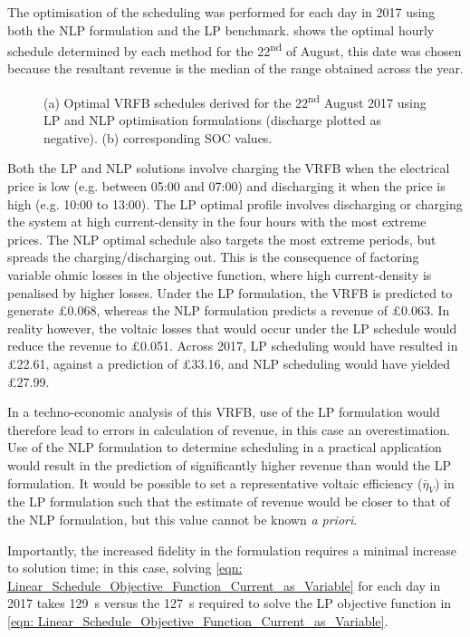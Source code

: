 \documentclass[preprint,3p,review,authoryear,10pt]{elsarticle}
\begin{document}
The optimisation of the scheduling was performed for each day in 2017 using both the NLP formulation and the LP benchmark.  shows the optimal hourly schedule determined by each method for the 22\textsuperscript{nd} of August, this date was chosen because the resultant revenue is the median of the range obtained across the year.

\begin{figure}[!ht]
\centering
{}
\caption{(a) Optimal VRFB schedules derived for the 22\textsuperscript{nd} August 2017 using LP and NLP optimisation formulations (discharge plotted as negative). (b) corresponding SOC values.}
\end{figure}

Both the LP and NLP solutions involve charging the VRFB when the electrical price is low (e.g. between 05:00 and 07:00) and discharging it when the price is high (e.g. 10:00 to 13:00). The LP optimal profile involves discharging or charging the system at high current-density in the four hours with the most extreme prices. The NLP optimal schedule also targets the most extreme periods, but spreads the charging/discharging out. This is the consequence of factoring variable ohmic losses in the objective function, where high current-density is penalised by higher losses. Under the LP formulation, the VRFB is predicted to generate \pounds 0.068, whereas the NLP formulation predicts a revenue of \pounds 0.063. In reality however, the voltaic losses that would occur under the LP schedule would reduce the revenue to \pounds 0.051. Across 2017, LP scheduling would have resulted in \pounds 22.61, against a prediction of \pounds 33.16, and NLP scheduling would have yielded \pounds 27.99.

In a techno-economic analysis of this VRFB, use of the LP formulation would therefore lead to errors in calculation of revenue, in this case an overestimation. Use of the NLP formulation to determine scheduling in a practical application would result in the prediction of significantly higher revenue than would the LP formulation. It would be possible to set a representative voltaic efficiency ($\bar\eta_V$) in the LP formulation such that the estimate of revenue would be closer to that of the NLP formulation, but this value cannot be known \textit{a priori}.

Importantly, the increased fidelity in the formulation requires a minimal increase to solution time; in this case, solving  \cref{eqn: Linear_Schedule_Objective_Function_Current_as_Variable} for each day in 2017 takes \SI{129}{\second} versus the \SI{127}{\second} required to solve the LP objective function in \cref{eqn: Linear_Schedule_Objective_Function_Current_as_Variable}.
\end{document}
